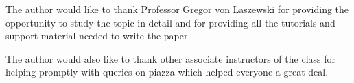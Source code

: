 \documentclass[sigconf]{acmart}
\begin{document}
\begin{acks}
The author would like to thank Professor Gregor von Laszewski for providing the opportunity to study the topic in detail and for providing all the tutorials and support material needed to write the paper.

The author would also like to thank other associate instructors of the class for helping promptly with queries on piazza which helped everyone a great deal.
\end{acks}


 


\end{document}
